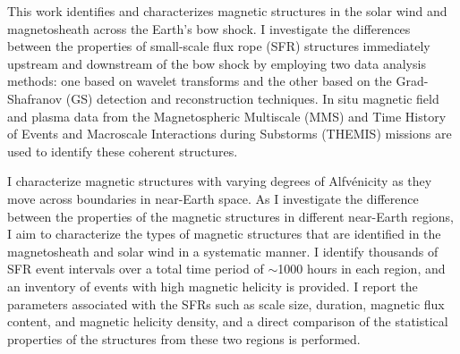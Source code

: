 
This work identifies and characterizes magnetic structures in the solar wind and magnetosheath across the Earth's bow shock. I investigate the differences between the properties of small-scale flux rope (SFR) structures immediately upstream and downstream of the bow shock by employing two data analysis methods: one based on wavelet transforms and the other based on the Grad-Shafranov (GS) detection and reconstruction techniques. In situ magnetic field and plasma data from the Magnetospheric Multiscale (MMS) and Time History of Events and Macroscale Interactions during Substorms (THEMIS) missions are used to identify these coherent structures. 

I characterize magnetic structures with varying degrees of Alfv\'enicity as they move across boundaries in near-Earth space. As I investigate the difference between the properties of the magnetic structures in different near-Earth regions, I aim to characterize the types of magnetic structures that are identified in the magnetosheath and solar wind in a systematic manner. I identify thousands of SFR event intervals over a total time period of $\sim$1000 hours in each region, and an inventory of events with high magnetic helicity is provided. I report the parameters associated with the SFRs such as scale size, duration, magnetic flux content, and magnetic helicity density, and a direct comparison of the statistical properties of the structures from these two regions is performed.

\clearpage

